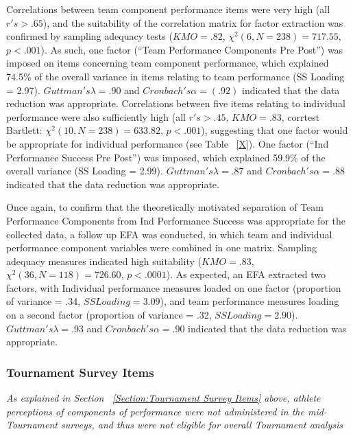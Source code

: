 \begin{CJK}{UTF8}{gbsn}
Correlations between team component performance items were very high (all $r's > .65$), and the suitability of the correlation matrix for factor extraction was confirmed by sampling adequacy tests ($KMO = .82$, $\chi^2(6, N = 238) = 717.55$, $p < .001$).  As such, one factor (``Team Performance Components Pre Post'') was imposed on items concerning team component performance, which explained 74.5\% of the overall variance in items relating to team performance (SS Loading = 2.97). $Guttman's \lambda =.90$ and $Cronbach's \alpha = (.92)$ indicated that the data reduction was appropriate.  Correlations between five items relating to individual performance were also sufficiently high (all $r's > .45$, $KMO = .83$, corrtest Bartlett: $\chi^2(10, N = 238) = 633.82$, $p < .001$), suggesting that one factor would be appropriate for individual performance (see Table ~\ref{X}).  One factor (``Ind Performance Success Pre Post'') was imposed, which explained 59.9\% of the overall variance (SS Loading = 2.99).  $Guttman's\lambda =.87$ and $Cronbach's \alpha = .88$ indicated that the data reduction was appropriate.

Once again, to confirm that the theoretically motivated separation of Team Performance Components from Ind Performance Success was appropriate for the collected data, a follow up EFA was conducted, in which team and individual performance component variables were combined in one matrix. Sampling adequacy measures indicated high suitability ($KMO = .83$, $\chi^2(36, N = 118) = 726.60$, $p < .0001$).  As expected, an EFA extracted two factors, with Individual performance measures loaded on one factor (proportion of variance = .34, $SS Loading = 3.09$), and team performance measures loading on a second factor (proportion of variance = .32, $SS Loading = 2.90$). $Guttman's \lambda =.93$ and $Cronbach's \alpha = .90$ indicated that the data reduction was appropriate.


\subsubsection{Tournament Survey Items}

\textit{As explained in Section ~\ref{Section:Tournament Survey Items} above, athlete perceptions of components of performance were not administered in the mid-Tournament surveys, and thus were not eligible for overall Tournament analysis}




\end{CJK}
